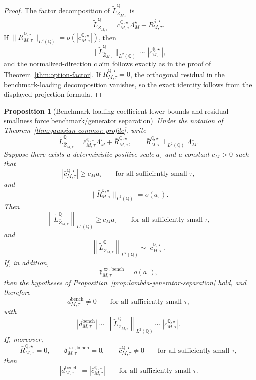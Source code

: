 \documentclass[11pt,a4paper]{amsart}
\theoremstyle{plain}
\newtheorem{proposition}[theorem]{Proposition}
\theoremstyle{definition}
\theoremstyle{remark}
\newcommand{\QQ}{\mathbb{Q}}
\begin{document}
\begin{proof}
The factor decomposition of \(\widetilde L_{\bar Z_{M,\tau}}^\QQ\) is
\[
        \widetilde L_{\bar Z_{M,\tau}}^\QQ
        =
        \bar c_{M,\tau}^{\QQ,\star}\Lambda_M^\star
        +
        \bar R_{M,\tau}^{\QQ,\star}.
\]
If
\(
        \|\bar R_{M,\tau}^{\QQ,\star}\|_{L^2(\QQ)}
        =
        o(|\bar c_{M,\tau}^{\QQ,\star}|)
\),
then
\[
        \|\widetilde L_{\bar Z_{M,\tau}}^\QQ\|_{L^2(\QQ)}
        \sim
        |\bar c_{M,\tau}^{\QQ,\star}|,
\]
and the normalized-direction claim follows exactly as in the proof of
Theorem~\ref{thm:option-factor}.  If \(\bar R_{M,\tau}^{\QQ,\star}=0\), the orthogonal residual in
the benchmark-loading decomposition vanishes, so the exact identity follows from the displayed
projection formula.
\end{proof}

\begin{proposition}[Benchmark-loading coefficient lower bounds and residual smallness force benchmark/generator separation]\label{prop:lambda-generator-separation-loading}
Under the notation of Theorem~\ref{thm:gaussian-common-profile}, write
\[
        \widetilde L_{\bar Z_{M,\tau}}^\QQ
        =
        \bar c_{M,\tau}^{\QQ,\star}\Lambda_M^\star
        +
        \bar R_{M,\tau}^{\QQ,\star},
        \qquad
        \bar R_{M,\tau}^{\QQ,\star}\perp_{L^2(\QQ)}\Lambda_M^\star.
\]
Suppose there exists a deterministic positive scale \(a_\tau\) and a constant \(c_M>0\) such that
\[
        \left|
                \bar c_{M,\tau}^{\QQ,\star}
        \right|
        \ge
        c_M a_\tau
        \qquad
        \text{for all sufficiently small }\tau,
\]
and
\[
        \|\bar R_{M,\tau}^{\QQ,\star}\|_{L^2(\QQ)}
        =
        o(a_\tau).
\]
Then
\[
        \left\|
                \widetilde L_{\bar Z_{M,\tau}}^\QQ
        \right\|_{L^2(\QQ)}
        \ge
        c_M a_\tau
        \qquad
        \text{for all sufficiently small }\tau,
\]
and
\[
        \left\|
                \widetilde L_{\bar Z_{M,\tau}}^\QQ
        \right\|_{L^2(\QQ)}
        \sim
        \left|
                \bar c_{M,\tau}^{\QQ,\star}
        \right|.
\]
If, in addition,
\[
        \mathfrak d_{M,\tau}^{\varpi,\mathrm{bench}}
        =
        o(a_\tau),
\]
then the hypotheses of Proposition~\ref{prop:lambda-generator-separation} hold, and therefore
\[
        d_{M,\tau}^{\mathrm{bench}}\neq0
        \qquad
        \text{for all sufficiently small }\tau,
\]
with
\[
        \left|
                d_{M,\tau}^{\mathrm{bench}}
        \right|
        \sim
        \left\|
                \widetilde L_{\bar Z_{M,\tau}}^\QQ
        \right\|_{L^2(\QQ)}
        \sim
        \left|
                \bar c_{M,\tau}^{\QQ,\star}
        \right|.
\]
If, moreover,
\[
        \bar R_{M,\tau}^{\QQ,\star}=0,
        \qquad
        \mathfrak d_{M,\tau}^{\varpi,\mathrm{bench}}=0,
        \qquad
        \bar c_{M,\tau}^{\QQ,\star}\neq0
        \qquad
        \text{for all sufficiently small }\tau,
\]
then
\[
        \left|
                d_{M,\tau}^{\mathrm{bench}}
        \right|
        =
        \left|
                \bar c_{M,\tau}^{\QQ,\star}
        \right|
        \qquad
        \text{for all sufficiently small }\tau.
\]
\end{proposition}
\end{document}
